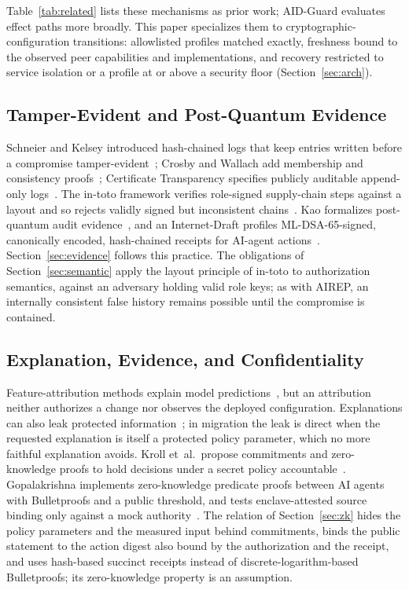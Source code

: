 Table~\ref{tab:related} lists these mechanisms as prior work; AID-Guard evaluates effect paths more broadly. This paper specializes them to cryptographic-configuration transitions: allowlisted profiles matched exactly, freshness bound to the observed peer capabilities and implementations, and recovery restricted to service isolation or a profile at or above a security floor (Section~\ref{sec:arch}).

\subsection{Tamper-Evident and Post-Quantum Evidence}
Schneier and Kelsey introduced hash-chained logs that keep entries written before a compromise tamper-evident~\cite{schneier}; Crosby and Wallach add membership and consistency proofs~\cite{crosby}; Certificate Transparency specifies publicly auditable append-only logs~\cite{ct}. The in-toto framework verifies role-signed supply-chain steps against a layout and so rejects validly signed but inconsistent chains~\cite{intoto}. Kao formalizes post-quantum audit evidence~\cite{kao}, and an Internet-Draft profiles ML-DSA-65-signed, canonically encoded, hash-chained receipts for AI-agent actions~\cite{asqav}. Section~\ref{sec:evidence} follows this practice. The obligations of Section~\ref{sec:semantic} apply the layout principle of in-toto to authorization semantics, against an adversary holding valid role keys; as with AIREP, an internally consistent false history remains possible until the compromise is contained.

\subsection{Explanation, Evidence, and Confidentiality}
Feature-attribution methods explain model predictions~\cite{shap,lime}, but an attribution neither authorizes a change nor observes the deployed configuration. Explanations can also leak protected information~\cite{shokri}; in migration the leak is direct when the requested explanation is itself a protected policy parameter, which no more faithful explanation avoids. Kroll et~al.\ propose commitments and zero-knowledge proofs to hold decisions under a secret policy accountable~\cite{kroll}. Gopalakrishna implements zero-knowledge predicate proofs between AI agents with Bulletproofs and a public threshold, and tests enclave-attested source binding only against a mock authority~\cite{gopalakrishna}. The relation of Section~\ref{sec:zk} hides the policy parameters and the measured input behind commitments, binds the public statement to the action digest also bound by the authorization and the receipt, and uses hash-based succinct receipts instead of discrete-logarithm-based Bulletproofs; its zero-knowledge property is an assumption.

